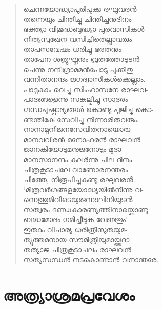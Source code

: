 \begin{verse}
ചെന്നയോദ്ധ്യാപുരിപുക്കു രഘുവരന്‍-\\
തന്നെയും ചിന്തിച്ചു ചിന്തിച്ചനുദിനം\\
ഭക്ത്യാ വിശുദ്ധബുദ്ധ്യാ പുരവാസികള്‍\\
നിത്യസുഖേന വസിച്ചിതെല്ലാവരും\\
താപസവേഷം ധരിച്ചു ഭരതനും\\
താപേന ശത്രുഘ്നനും വ്രതത്തോടുടന്‍\\
ചെന്നു നന്ദിഗ്രാമമന്‍പോടു പുക്കിതു\\
വന്നിതാനന്ദം ജഗദ്വാസികള്‍ക്കെല്ലാം.\\
പാദുകാം വെച്ചു സിംഹാസനേ രാഘവ-\\
പാദങ്ങളെന്നു സങ്കല്പിച്ചു സാദരം\\
ഗന്ധപുഷ്പാദ്യങ്ങള്‍ കൊണ്ടു പൂജിച്ചു കൊ-\\
ണ്ടന്തികേ സേവിച്ചു നിന്നാരിരുവരും.\\
നാനാമുനിജനസേവിതനായൊരു\\
മാനവവീരന്‍ മനോഹരന്‍ രാഘവന്‍\\
ജാനകിയോടുമനുജനോടും മുദാ\\
മാനസാനന്ദം കലര്‍ന്നു ചില ദിനം\\
ചിത്രകൂടാചലേ വാണോരനന്തരം\\
ചിത്തേ, നിരൂപിച്ചുകണ്ടു രഘുവരന്‍.\\
‘മിത്രവര്‍ഗങ്ങളയോദ്ധ്യയില്‍നിന്നു വ-\\
ന്നെത്തുമിവിടെയുരുന്നാലിനിയുടന്‍\\
സത്വരം ദണ്ഡകാരണ്യത്തിനായ്ക്കൊണ്ടു\\
ബദ്ധമോദം ഗമിച്ചീടുക വേണ്ടതും’\\
ഇത്ഥം വിചാര്യ ധരിത്രീസുതയുമ-\\
ത്യുത്തമനായ സൗമിത്രിയുമായ്ത്തദാ\\
തത്യാജ ചിത്രകൂടാചലം രാഘവന്‍\\
സത്യസന്ധന്‍ നടകൊണ്ടാന്‍ വനാന്തരേ.
\end{verse}


\section{അത്ര്യാശ്രമപ്രവേശം}

